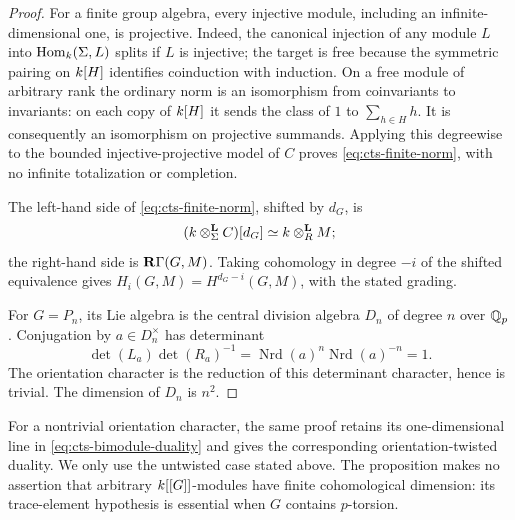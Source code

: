 \begin{proof}
For a finite group algebra, every injective module, including an
infinite-dimensional one, is projective.  Indeed, the canonical
injection of any module $L$ into
$\operatorname{Hom}_k(\Sigma,L)$ splits if $L$ is injective; the target is free
because the symmetric pairing on $k[H]$ identifies coinduction
with induction.  On a free module of arbitrary rank the ordinary
norm is an isomorphism from coinvariants to invariants: on each
copy of $k[H]$ it sends the class of $1$ to $\sum_{h\in H}h$.
It is consequently an isomorphism on projective summands.  Applying
this degreewise to the bounded injective-projective model of $C$
proves \eqref{eq:cts-finite-norm}, with no infinite totalization or
completion.

The left-hand side of \eqref{eq:cts-finite-norm}, shifted by $d_G$,
is
\[
 (k\otimes_\Sigma^{\mathbf L}C)[d_G]
       \simeq k\otimes_R^{\mathbf L}M;
\]
the right-hand side is $\mathbf R\Gamma(G,M)$.  Taking cohomology in
degree $-i$ of the shifted equivalence gives
$H_i(G,M)=H^{d_G-i}(G,M)$, with the stated grading.

For $G=P_n$, its Lie algebra is the central division algebra
$D_n$ of degree $n$ over $\mathbb Q_p$.  Conjugation by $a\in D_n^\times$
has determinant
\[
 \det(L_a)\det(R_a)^{-1}
   =\operatorname{Nrd}(a)^n\operatorname{Nrd}(a)^{-n}=1.
\]
The orientation character is the reduction of this determinant
character, hence is trivial.  The dimension of $D_n$ is $n^2$.
\end{proof}

\begin{remark}
For a nontrivial orientation character, the same proof retains its
one-dimensional line in \eqref{eq:cts-bimodule-duality} and gives
the corresponding orientation-twisted duality.  We only use the
untwisted case stated above.  The proposition makes no assertion
that arbitrary $k[[G]]$-modules have finite cohomological
dimension: its trace-element hypothesis is essential when $G$
contains $p$-torsion.
\end{remark}
